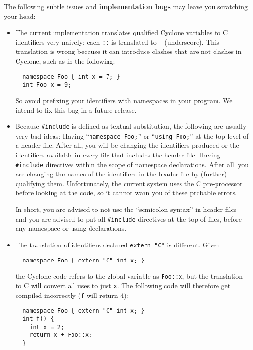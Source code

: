 The following subtle issues and \textbf{implementation bugs} may leave
you scratching your head:
\begin{itemize}
\item The current implementation translates qualified Cyclone
  variables to C identifiers very naively: each \texttt{::} is
  translated to \texttt{_} (underscore).  This translation is wrong
  because it can introduce clashes that are not clashes in Cyclone,
  such as in the following:
\begin{verbatim}
  namespace Foo { int x = 7; }
  int Foo_x = 9;
\end{verbatim}
  
  So avoid prefixing your identifiers with namespaces in your program.
  We intend to fix this bug in a future release.
  
\item Because \texttt{\#include} is defined as textual substitution, the
  following are usually very bad ideas: Having ``\texttt{namespace Foo;}''
  or ``\texttt{using Foo;}'' at the top level of a header file.
  After all, you will be changing the identifiers produced or the
  identifiers available in every file that includes the header file.
  Having \texttt{\#include} directives within the scope of namespace
  declarations.  After all, you are changing the names of the
  identifiers in the header file by (further) qualifying them.
  Unfortunately, the current system uses the C pre-processor before
  looking at the code, so it cannot warn you of these probable errors.
  
  In short, you are advised to not use the ``semicolon syntax'' in
  header files and you are advised to put all \texttt{\#include}
  directives at the top of files, before any namespace or using
  declarations.
  
\item The translation of identifiers declared \texttt{extern "C"} is
  different.  Given
\begin{verbatim}
  namespace Foo { extern "C" int x; }
\end{verbatim}
  the Cyclone code refers to the global variable as \texttt{Foo::x}, but
  the translation to C will convert all uses to just \texttt{x}.  The
  following code will therefore get compiled incorrectly (\texttt{f}
  will return 4):
\begin{verbatim}
  namespace Foo { extern "C" int x; }
  int f() {
    int x = 2;
    return x + Foo::x;
  }
\end{verbatim}
\end{itemize}

